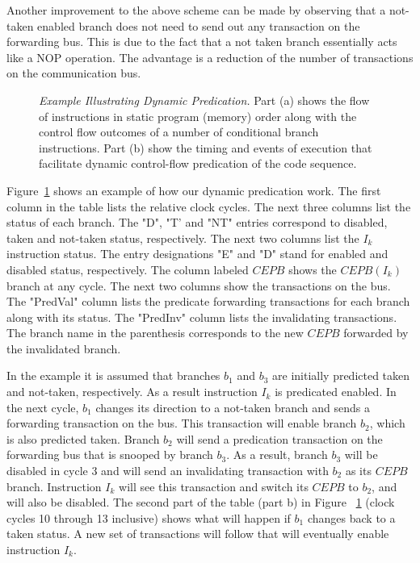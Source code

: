 \documentclass[10pt,twocolumn]{IEEEtran}
\begin{document}
Another improvement to the above scheme can be made by observing
that a not-taken enabled branch does not need to send out any
transaction on the forwarding bus.  This is due to the fact that a
not taken branch essentially acts like a NOP operation.  The
advantage is a reduction of the number of transactions on the 
communication bus.
%
\begin{figure}
\caption{{\em Example Illustrating Dynamic Predication.}
Part (a) shows the flow of instructions in static program (memory) order
along with the control flow outcomes of a number of conditional branch 
instructions.  Part (b) show the timing and events of execution
that facilitate dynamic control-flow predication of the code sequence.}
\label{fig:dynpred}
\end{figure}
%
Figure~\ref{fig:dynpred} shows an example of how our dynamic
predication work.  The f{ir}st column in the table lists the relative
clock cycles.  The next three columns list the status of each
branch.  The "D", "T' and "NT" entries correspond to disabled,
taken and not-taken status, respectively.  The next two columns
list the $I_k$ instruction status.  The entry designations "E" and "D" 
stand for enabled
and disabled status, respectively.  The column labeled $CEPB$ shows the
$CEPB(I_k)$ branch at any cycle.  The next two columns show the
transactions on the bus.  The "PredVal" column lists the predicate
forwarding transactions for each branch along with its status.  The
"PredInv" column lists the invalidating transactions.  The branch
name in the parenthesis corresponds to the new $CEPB$ forwarded by
the invalidated branch.

In the example it is assumed that branches $b_1$ and $b_3$ are initially
predicted taken and not-taken, respectively.  
As a result instruction $I_k$ is predicated enabled.  
In the next cycle, $b_1$ changes its direction to a
not-taken branch and sends a forwarding transaction on the bus.
This transaction will enable branch $b_2$, which is also predicted taken.
Branch $b_2$ will send a predication transaction on the forwarding bus
that is snooped by branch $b_3$.  
As a result, branch $b_3$ will be disabled in
cycle 3 and will send an invalidating transaction with $b_2$ as
its $CEPB$ branch.  Instruction $I_k$ will see this transaction and
switch its $CEPB$ to $b_2$, and will also be disabled.  
The
second part of the table (part b) in Figure ~\ref{fig:dynpred} 
(clock cycles 10 through 13 inclusive) shows what
will happen if $b_1$ changes back to a taken status.  
A new set of transactions will follow that will eventually enable 
instruction $I_k$.
\end{document}
